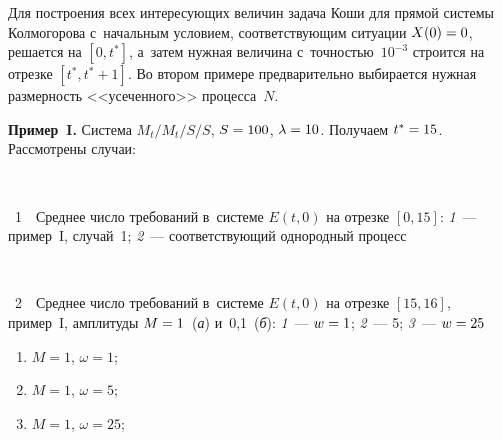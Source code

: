 \begin{multicols}{2}
Для построения всех интересующих величин задача Коши для прямой
системы Колмогорова с~начальным условием, соответствующим ситуации
$X(0)\hm=0$, решается на  $[0, t^*]$, а~затем нужная величина 
с~точ\-ностью~$10^{-3}$ строится на отрезке $[t^*,t^*+1]$. Во втором
примере предварительно выбирается нужная размерность <<усеченного>>
процесса~$N$.

\noindent
\textbf{Пример~I.} Система $M_t/M_t/S/S$, $S\hm=100$, $\la\hm=10$. Получаем
$t^*\hm=15$. Рассмотрены случаи:

{ \begin{center}  %
 \vspace*{-4pt}
  \mbox{%
 \epsfxsize=74.19mm 
 }


\end{center}

\vspace*{-1pt}


\noindent
{{\figurename~1}\ \ \small{Среднее число требований в~системе $E(t,0)$ на
отрезке $[0,15]$: \textit{1}~--- пример~I, случай~1; \textit{2}~--- 
соответствующий однородный процесс}}

}

\vspace*{9pt}


{ \begin{center}  %
 \vspace*{5pt}
 \mbox{%
 \epsfxsize=79mm 
 }


\end{center}

\vspace*{-1pt}


\noindent
{{\figurename~2}\ \ \small{Среднее число требований в~системе $E(t,0)$ на
отрезке $[15,16]$, пример~I, амплитуды $M\hm=1$~(\textit{а})
и~0,1~(\textit{б}): \textit{1}~--- $w\hm=1$; \textit{2}~--- 5; \textit{3}~--- $w\hm=25$}}

}

\vspace*{3pt}

\begin{enumerate}[(1)]
\item  $M=1$, $\omega =1$;
\item  $M=1$, $\omega =5$;
\item  $M=1$, $\omega =25$;
\end{enumerate}

{ \begin{center}  %
 \vspace*{-5pt}
\mbox{%
 \epsfxsize=75.719mm 
 }



\end{center}}
\end{multicols}
